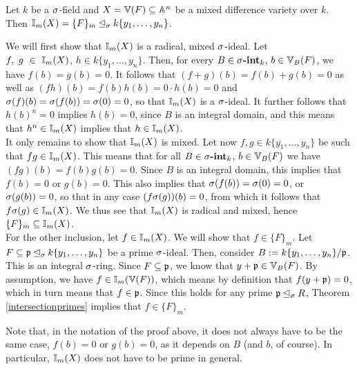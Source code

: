 \begin{prop}\label{I=F_m}
Let $k$ be a $\sigma$-field and $X = \mathbb{V}(F) \subseteq \mathbb{A}^n$ be a mixed difference variety over $k$. Then $\mathbb{I}_m(X) = \{F\}_m \unlhd_{\sigma} k\{y_1,\ldots,y_n\}$. 
\begin{bew}
We will first show that $\mathbb{I}_m(X)$ is a radical, mixed $\sigma$-ideal.
Let \\ $f,~g~\in~\mathbb{I}_m(X)$, $h \in k\{y_1,\ldots,y_n\}$. Then, for every $B \in \sigma\text{{\normalfont\textbf{-int}}}_k$, $b \in \mathbb{V}_B(F)$, we have $f(b) = g(b) = 0$.
It follows that $(f + g)(b) = f(b) + g(b) = 0$ as well as $(fh)(b) = f(b)h(b) = 0 \cdot h(b) = 0$ and $\sigma(f)(b) = \sigma(f(b)) = \sigma(0) = 0$, so that $\mathbb{I}_m(X)$ is a $\sigma$-ideal.
It further follows that $h(b)^n = 0$ implies $h(b) = 0$, since $B$ is an integral domain, and this means that $h^n \in \mathbb{I}_m(X)$ implies that $ h \in \mathbb{I}_m(X)$. \\
\indent It only remains to show that $\mathbb{I}_m(X)$ is mixed. Let now $f,g \in k\{y_1,\ldots,y_n\}$ be such that $fg \in \mathbb{I}_m(X)$. This means that for all  $B \in \sigma\text{{\normalfont\textbf{-int}}}_k$, $b \in \mathbb{V}_B(F)$ we have
 $(fg)(b) = f(b) g(b) = 0$. Since $B$ is an integral domain,
this implies that $f(b) = 0$ or $g(b) = 0$. This also implies that $\sigma(f(b)) = \sigma(0) = 0$, or $\sigma(g(b)) = 0$, so that in any case $(f\sigma(g))(b) = 0$, from which it follows that $f\sigma(g) \in \mathbb{I}_m(X)$. We thus see that $\mathbb{I}_m(X)$ is radical and mixed, hence $\{F\}_m \subseteq \mathbb{I}_m(X)$. \\
\indent For the other inclusion, let $f \in \mathbb{I}_m(X)$. We will show that $f \in \{F\}_m$. Let $F \subseteq \mathfrak{p} \unlhd_{\sigma} k\{y_1,\ldots,y_n\}$ be a prime $\sigma$-ideal.
Then, consider $B:= k\{y_1,\ldots,y_n\}/\mathfrak{p}$. This is an integral $\sigma$-ring. Since $F \subseteq \mathfrak{p}$, we know that $y + \mathfrak{p} \in \mathbb{V}_B(F)$. By assumption, we have $f \in \mathbb{I}_m(\mathbb{V}(F))$, which means by definition that $f(y + \mathfrak{p}) = 0$, which
in turn means that $f \in \mathfrak{p}$. Since this holds for any prime $\mathfrak{p} \unlhd_{\sigma} R$, Theorem \ref{intersectionprimes} implies that $f \in \{F\}_m$.
\end{bew}
\end{prop}
Note that, in the notation of the proof above,  it does not always have to be the same case, $f(b) = 0$ or $g(b) = 0$, as it depends on $B$ (and $b$, of course). In particular, $\mathbb{I}_m(X)$ does not have to be prime in general. \\

